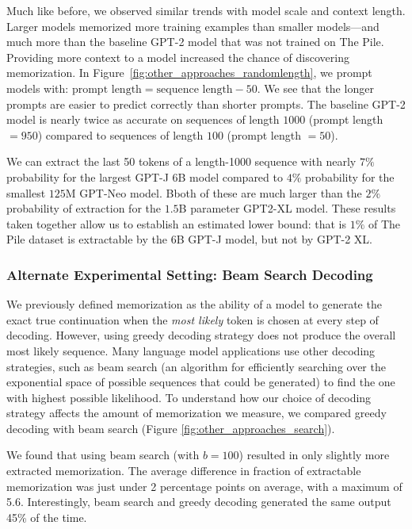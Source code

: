 Much like before, we observed similar trends with model scale and context length.
Larger models memorized more training examples than smaller models---and much more than the baseline GPT-2 model
that was not trained on The Pile.
%
Providing more context to a model increased
the chance of discovering memorization.
%
In Figure~\ref{fig:other_approaches_randomlength}, we prompt models with: $\text{prompt length} = \text{sequence length} - 50$. We see that the longer prompts are easier to predict correctly than shorter prompts. 
The baseline GPT-2 model is nearly twice as accurate on
sequences of length $1000$ (prompt length $ = 950$) compared to sequences of length $100$ (prompt length $ = 50$).
%

We can extract the last 50 tokens of
a length-1000 sequence with nearly $7\%$ probability
for the largest GPT-J 6B model compared to $4\%$ probability 
for the smallest $125$M GPT-Neo model.
Bboth
of these are much larger than the $2\%$ probability 
of extraction for the $1.5$B parameter GPT2-XL model.
%
These results taken together allow us to establish an estimated lower bound: that is $1\%$ of The Pile dataset is extractable by the 6B GPT-J model, but not by GPT-2 XL.


\subsubsection{Alternate Experimental Setting: Beam Search Decoding}
We previously defined memorization as the ability of a model to generate the exact true continuation when the \emph{most likely} token is chosen at every step of decoding.
However, using greedy decoding strategy does not produce the overall most likely sequence.
Many language model applications use other decoding strategies, such as beam search (an algorithm for efficiently searching over the exponential space of possible sequences that could be generated) to find the one with highest possible likelihood.
To understand how our choice of decoding strategy affects the amount of memorization we measure, we compared greedy decoding with beam search (Figure \ref{fig:other_approaches_search}).

We found that using beam search (with $b = 100$) resulted in only slightly more extracted memorization.
The average difference in fraction of extractable memorization was just under 2 percentage points on average, with a maximum of 5.6. %
Interestingly, beam search and greedy decoding generated the same output 45\% of the time.

